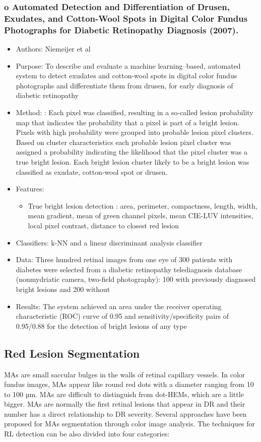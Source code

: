 \documentclass[12pt]{report}
\begin{document}
\subsubsection{o    Automated Detection and Differentiation of Drusen, Exudates, and Cotton-Wool Spots in Digital Color Fundus Photographs for Diabetic Retinopathy Diagnosis (2007). \cite{niemeijer2007automated}}
\begin{itemize}
\item Authors: Niemeijer et al
\item Purpose: To describe and evaluate a machine learning–based, automated system to detect exudates and cotton-wool spots in digital color fundus photographs and differentiate them from drusen, for early diagnosis of diabetic retinopathy
\item Method: : Each pixel was classified, resulting in a so-called lesion probability map that indicates the probability that a pixel is part of a bright lesion. Pixels with high probability were grouped into probable lesion pixel clusters. Based on cluster characteristics each probable lesion pixel cluster was assigned a probability indicating the likelihood that the pixel cluster was a true bright lesion. Each bright lesion cluster likely to be a bright lesion was classified as exudate, cotton-wool spot or drusen.
\item Features:
\begin{itemize}
\item True bright lesion detection : area, perimeter, compactness, length, width, mean gradient, mean of green channel pixels, mean CIE-LUV intensities, local pixel contrast, distance to closest red lesion
\end{itemize}
\item Classifiers: k-NN and a linear discriminant analysis classifier
\item Data: Three hundred retinal images from one eye of 300 patients with diabetes were selected from a diabetic retinopathy telediagnosis database (nonmydriatic camera, two-field photography): 100 with previously diagnosed bright lesions and 200 without
\item Results: The system achieved an area under the receiver operating characteristic (ROC) curve of 0.95 and sensitivity/specificity pairs of 0.95/0.88 for the detection of bright lesions of any type
\end{itemize}

\subsection{Red Lesion Segmentation}
MAs are small saccular bulges in the walls of retinal capillary vessels. In color fundus images, MAs appear like round red dots with a diameter ranging from 10 to 100 µm. MAs are difficult to distinguish from dot-HEMs, which are a little bigger. MAs are normally the first retinal lesions that appear in DR and their number has a direct relationship to DR severity. Several approaches have been proposed for MAs segmentation through color image analysis. The techniques for RL detection can be also divided into four categories:
\end{document}
